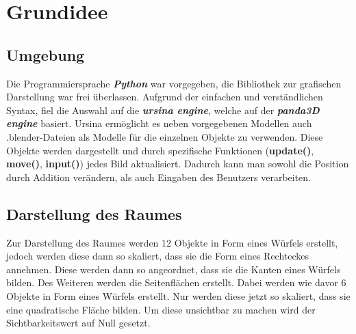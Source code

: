 \documentclass[a4paper, hidelinks, 12pt]{article}
\begin{document}
\section{Grundidee}
\subsection{Umgebung}
Die Programmiersprache \emph{\textbf{Python}} war vorgegeben, die Bibliothek zur grafischen Darstellung war frei überlassen. Aufgrund der einfachen und verständlichen Syntax, fiel die Auswahl auf die \emph{\textbf{ursina engine}}\cite{2022k}, welche auf der \emph{\textbf{panda3D engine}} basiert. Ursina ermöglicht es neben vorgegebenen Modellen auch .blender-Dateien als Modelle für die einzelnen Objekte zu verwenden. Diese Objekte werden dargestellt und durch spezifische Funktionen (\textbf{update()}, \textbf{move()}, \textbf{input()}) jedes Bild aktualisiert\cite{2022}. Dadurch kann man sowohl die Position durch Addition verändern, als auch Eingaben des Benutzers verarbeiten. 
	
\subsection{Darstellung des Raumes}
Zur Darstellung des Raumes werden 12 Objekte in Form eines Würfels erstellt, jedoch werden diese dann so skaliert, dass sie die Form eines Rechteckes annehmen. Diese werden dann so angeordnet, dass sie die Kanten eines Würfels bilden. 
Des Weiteren werden die Seitenflächen erstellt. Dabei werden wie davor 6 Objekte in Form eines Würfels erstellt. Nur werden diese jetzt so skaliert, dass sie eine quadratische Fläche bilden. Um diese unsichtbar zu machen wird der Sichtbarkeitswert auf Null gesetzt.\cite{2022l}
		
\end{document}
